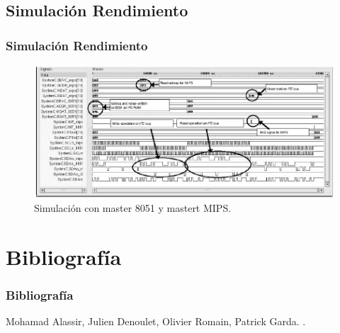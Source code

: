 \documentclass[pstricks,serif, 10pt]{beamer}
\begin{document}
\subsection[Rendimiento]{Simulación Rendimiento}
\begin{frame}
 \frametitle{Simulación Rendimiento}
 \begin{figure}[H]
  \centering
    \includegraphics[scale=0.39]{sim3.png}
      \caption{Simulación con master 8051 y mastert MIPS.}
	\label{fig5}
\end{figure}  
\end{frame}

\section{Bibliografía}
\begin{frame}
  \frametitle{Bibliografía}    
  \begin{thebibliography}{10}    
  \beamertemplatearticlebibitems
    Mohamad Alassir, Julien Denoulet, Olivier Romain, Patrick Garda.
    .
  \end{thebibliography}
\end{frame}
\end{document}
